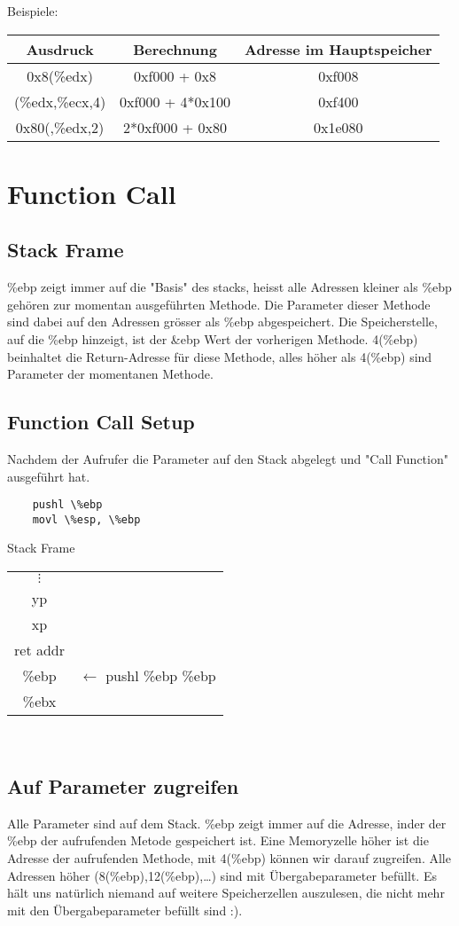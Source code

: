 \documentclass[a4paper, 11pt]{article}
\begin{document}
Beispiele:
\begin{tabular}{|c|c|c|}
	\hline
	Ausdruck & Berechnung & Adresse im Hauptspeicher \\\hline\hline
	0x8(\%edx) & 0xf000 + 0x8 & 0xf008 \\\hline
	(\%edx,\%ecx,4)&0xf000 + 4*0x100&0xf400\\\hline
	0x80(,\%edx,2)&2*0xf000 + 0x80 & 0x1e080\\\hline
\end{tabular}

\section{Function Call}
\subsection{Stack Frame}
\%ebp zeigt immer auf die "Basis" des stacks, heisst alle Adressen kleiner als \%ebp gehören zur momentan ausgeführten Methode. Die Parameter dieser Methode sind dabei auf den Adressen grösser als \%ebp abgespeichert. Die Speicherstelle, auf die \%ebp hinzeigt, ist der \&ebp Wert der vorherigen Methode. 4(\%ebp) beinhaltet die Return-Adresse für diese Methode, alles höher als 4(\%ebp) sind Parameter der momentanen Methode.

\subsection{Function Call Setup}
Nachdem der Aufrufer die Parameter auf den Stack abgelegt und "Call Function" ausgeführt hat.
\begin{lstlisting}
	pushl \%ebp
	movl \%esp, \%ebp
\end{lstlisting}

Stack Frame
\begin{tabular}{|c|c}
	$\vdots$&\\\cline{0-0}
	yp\\\cline{0-0}
	xp\\\cline{0-0}
	ret addr\\\cline{0-0}
	\%ebp & $\leftarrow$ pushl \%ebp 			\%ebp\\\cline{0-0}
 	\%ebx\\\cline{0-0}
\end{tabular}\\

\subsection{Auf Parameter zugreifen}
Alle Parameter sind auf dem Stack. \%ebp zeigt immer auf die Adresse, inder der \%ebp der aufrufenden Metode gespeichert ist. Eine Memoryzelle höher ist die Adresse der aufrufenden Methode, mit 4(\%ebp) können wir darauf zugreifen. Alle Adressen höher (8(\%ebp),12(\%ebp),\ldots) sind mit Übergabeparameter befüllt. Es hält uns natürlich niemand auf weitere Speicherzellen auszulesen, die nicht mehr mit den Übergabeparameter befüllt sind :).
 
\end{document}
